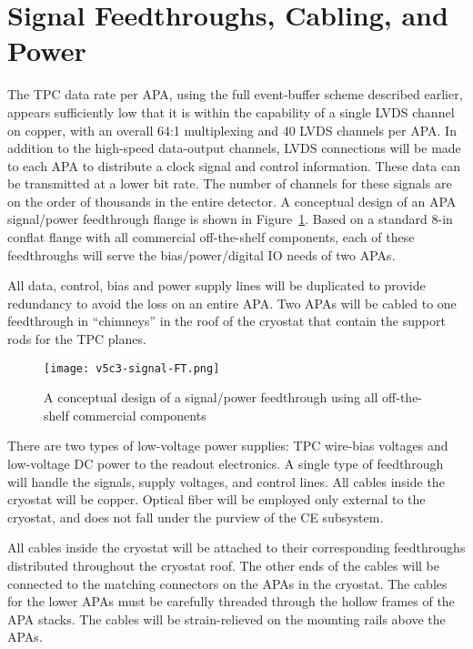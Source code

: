 %
\section{Signal Feedthroughs, Cabling, and Power}
\label{sec:ce-feedthrough}

The TPC data rate per APA, using the full event-buffer scheme described earlier,
appears sufficiently low that it is within the capability of a single LVDS channel on copper, with an overall 64:1
multiplexing and 40 LVDS channels per APA.
In addition to the high-speed data-output channels,
LVDS connections will be made to each APA to distribute a clock signal and control information.
These data can be transmitted at a lower bit rate.
The number of channels for these signals are on the order of thousands in the entire detector.
A conceptual design of an APA signal/power feedthrough flange is shown in Figure~\ref{fig:ce-feedthrough}.
Based on a standard 8-in conflat flange with all commercial off-the-shelf components,
each of these feedthroughs will serve the bias/power/digital IO needs of two APAs.  

All data, control, bias and power supply lines will be duplicated to
provide redundancy to avoid the loss on an entire APA.
Two APAs will be cabled to one feedthrough in ``chimneys'' in the roof of the cryostat that
contain the support rods for the TPC planes.

\begin{figure}[htbp]
\centering
\texttt{[image: v5c3-signal-FT.png]}
\caption[Conceptual design of signal/power feedthrough]{A conceptual design of a signal/power feedthrough using all off-the-shelf commercial components}
\label{fig:ce-feedthrough}
\end{figure}

There are two types of low-voltage power supplies:
TPC wire-bias voltages and low-voltage DC power to the readout electronics.
A single type of feedthrough will handle the signals, supply voltages, and control lines.
All cables inside the cryostat will be copper.
Optical fiber will be employed only external to the cryostat, and does not fall under the purview of the CE subsystem.

All cables inside the cryostat will be attached to their corresponding feedthroughs distributed throughout the cryostat roof.
The other ends of the cables will be connected to the matching connectors on the APAs in the cryostat.
The cables for the lower APAs must be carefully threaded through the hollow frames of the APA stacks.
The cables will be strain-relieved on the  mounting rails above the APAs. 

